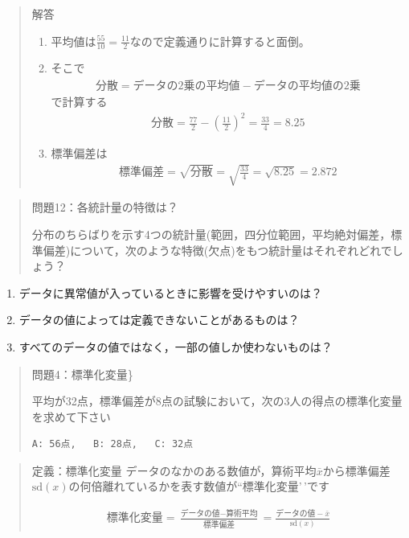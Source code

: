 \documentclass[
]{book}
\providecommand{\tightlist}{%
  \setlength{\itemsep}{0pt}\setlength{\parskip}{0pt}}
\theoremstyle{definition}
\theoremstyle{definition}
\theoremstyle{definition}
\theoremstyle{definition}
\theoremstyle{remark}
\begin{document}
\begin{quote}
解答

\begin{enumerate}
\def\labelenumi{\arabic{enumi}.}
\item
  平均値は\(\frac{55}{10}=\frac{11}{2}\)なので定義通りに計算すると面倒。
\item
  そこで
  \begin{align*}
  \text{分散}=\text{データの2乗の平均値}-\text{データの平均値の2乗}
  \end{align*}
  で計算する
  \begin{align*}
  \text{分散}=\frac{77}{2}-\left( \frac{11}{2} \right)^2=\frac{33}{4}=8.25
  \end{align*}
\item
  標準偏差は
  \begin{align*}
  \text{標準偏差}=\sqrt{\text{分散}}=\sqrt{\frac{33}{4}}=\sqrt{8.25}=2.872
  \end{align*}
\end{enumerate}
\end{quote}

\begin{quote}
問題12：各統計量の特徴は？

分布のちらばりを示す4つの統計量(範囲，四分位範囲，平均絶対偏差，標準偏差)について，次のような特徴(欠点)をもつ統計量はそれぞれどれでしょう？
\end{quote}

\begin{enumerate}
\def\labelenumi{\arabic{enumi}.}
\tightlist
\item
  データに異常値が入っているときに影響を受けやすいのは？
\item
  データの値によっては定義できないことがあるものは？
\item
  すべてのデータの値ではなく，一部の値しか使わないものは？
\end{enumerate}

\begin{quote}
問題4：標準化変量\}

平均が32点，標準偏差が8点の試験において，次の3人の得点の標準化変量を求めて下さい

\begin{verbatim}
A: 56点,   B: 28点,   C: 32点
\end{verbatim}
\end{quote}

\begin{quote}
定義：標準化変量
データのなかのある数値が，算術平均\(\bar{x}\)から標準偏差\(\text{sd}(x)\)の何倍離れているかを表す数値が``標準化変量'\,'です

\begin{align*}
\text{標準化変量}
=\frac{\text{データの値}-\text{算術平均}}{\text{標準偏差}}
=\frac{\text{データの値}-\bar{x}}{\text{sd}(x)}
\end{align*}
\end{quote}
\end{document}
